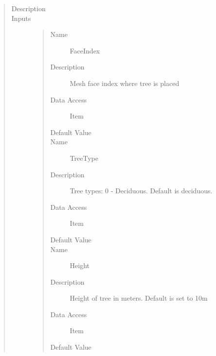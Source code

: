 \documentclass[letterpaper,10pt,english]{sphinxmanual}
\begin{document}
\begin{quote}\begin{description}
\item[{Description}] \leavevmode
{}

\item[{Inputs}] \leavevmode\begin{quote}\begin{description}
\item[{Name}] \leavevmode
FaceIndex

\item[{Description}] \leavevmode
Mesh face index where tree is placed

\item[{Data Access}] \leavevmode
Item

\item[{Default Value}] \leavevmode
{}

\item[{Name}] \leavevmode
TreeType

\item[{Description}] \leavevmode
Tree types: 0 - Deciduous. Default is deciduous.

\item[{Data Access}] \leavevmode
Item

\item[{Default Value}] \leavevmode
{}

\item[{Name}] \leavevmode
Height

\item[{Description}] \leavevmode
Height of tree in meters. Default is set to 10m

\item[{Data Access}] \leavevmode
Item

\item[{Default Value}] \leavevmode
{}


\end{description}
\end{quote}
\end{description}
\end{quote}
\end{document}
